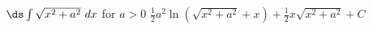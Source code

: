 {$\ds \int \sqrt{x^2+a^2}\ dx$ for $a>0$
}
{$\frac{1}{2}a^2\ln\left(\sqrt{x^2+a^2}+x\right)+\frac{1}{2}x\sqrt{x^2+a^2}+C$
}